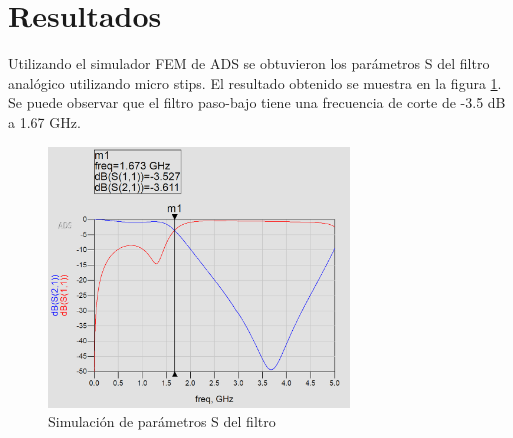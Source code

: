 \section{Resultados}

Utilizando el simulador FEM de ADS se obtuvieron los parámetros S del filtro analógico utilizando micro stips. El resultado obtenido se muestra en la figura     \ref{fig:resultado_parametros_s}. Se puede observar que el filtro paso-bajo tiene una frecuencia de corte de -3.5 dB a 1.67 GHz.

\begin{figure}[h!]
    \centering
    \includegraphics[width=8cm]{figures/resultado.png}
    \caption{Simulación de parámetros S del filtro}
    \label{fig:resultado_parametros_s}
\end{figure}